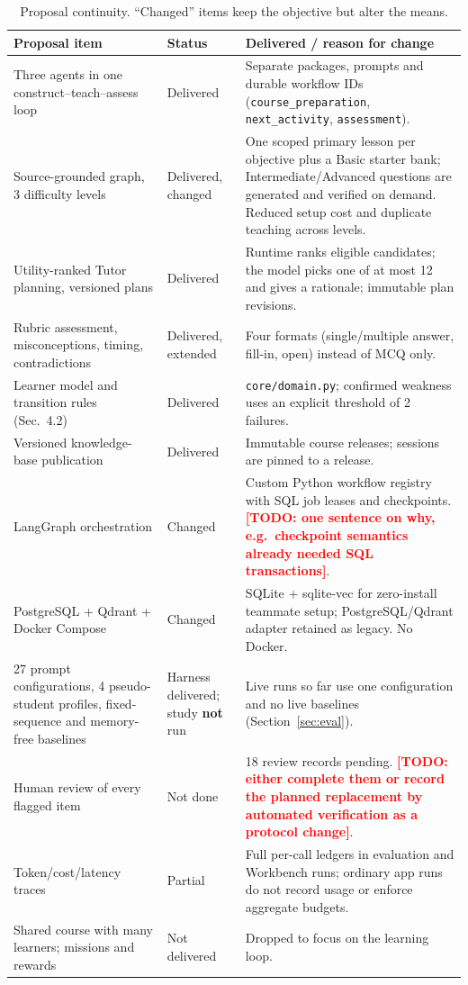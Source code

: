 \documentclass{article}
\newcommand{\todo}[1]{\textcolor{red}{\textbf{[TODO: #1]}}}
\newcommand{\code}[1]{\texttt{\small #1}}
\begin{document}
\begin{table}[H]
\centering
\small
\caption{Proposal continuity. ``Changed'' items keep the objective but alter the means.}
\label{tab:continuity}
\begin{tabularx}{\linewidth}{@{}p{3.6cm}p{1.6cm}X@{}}
\toprule
\textbf{Proposal item} & \textbf{Status} & \textbf{Delivered / reason for change} \\
\midrule
Three agents in one construct--teach--assess loop & Delivered & Separate packages, prompts and durable workflow IDs (\code{course\_preparation}, \code{next\_activity}, \code{assessment}). \\
Source-grounded graph, 3 difficulty levels & Delivered, changed & One scoped primary lesson per objective plus a Basic starter bank; Intermediate/Advanced questions are generated and verified on demand. Reduced setup cost and duplicate teaching across levels. \\
Utility-ranked Tutor planning, versioned plans & Delivered & Runtime ranks eligible candidates; the model picks one of at most 12 and gives a rationale; immutable plan revisions. \\
Rubric assessment, misconceptions, timing, contradictions & Delivered, extended & Four formats (single/multiple answer, fill-in, open) instead of MCQ only. \\
Learner model and transition rules (Sec.~4.2) & Delivered & \code{core/domain.py}; confirmed weakness uses an explicit threshold of 2 failures. \\
Versioned knowledge-base publication & Delivered & Immutable course releases; sessions are pinned to a release. \\
LangGraph orchestration & Changed & Custom Python workflow registry with SQL job leases and checkpoints. \todo{one sentence on why, e.g.\ checkpoint semantics already needed SQL transactions}. \\
PostgreSQL + Qdrant + Docker Compose & Changed & SQLite + sqlite-vec for zero-install teammate setup; PostgreSQL/Qdrant adapter retained as legacy. No Docker. \\
27 prompt configurations, 4 pseudo-student profiles, fixed-sequence and memory-free baselines & Harness delivered; study \textbf{not} run & Live runs so far use one configuration and no live baselines (Section~\ref{sec:eval}). \\
Human review of every flagged item & Not done & 18 review records pending. \todo{either complete them or record the planned replacement by automated verification as a protocol change}. \\
Token/cost/latency traces & Partial & Full per-call ledgers in evaluation and Workbench runs; ordinary app runs do not record usage or enforce aggregate budgets. \\
Shared course with many learners; missions and rewards & Not delivered & Dropped to focus on the learning loop. \\
\bottomrule
\end{tabularx}
\end{table}
\end{document}
